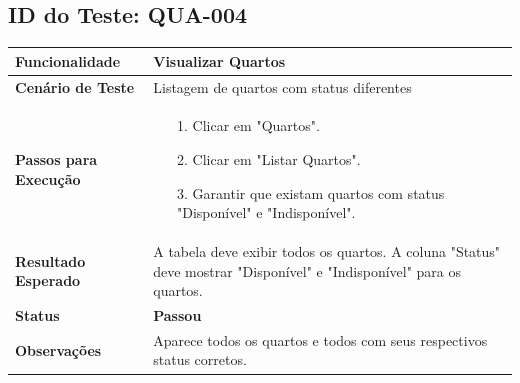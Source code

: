 \documentclass[
	12pt,				%
	openany,			%
	oneside,			%
	a4paper,			%
	english,			%
	french,				%
	spanish,			%
	brazil				%
	]{abntex2}
\begin{document}
\begin{apendicesenv}
\begin{tabular}{@{} p{5cm} p{11cm} @{}}
\end{tabular}
\vspace{1cm}

\subsection*{ID do Teste: QUA-004}
\begin{tabular}{@{} p{5cm} p{11cm} @{}}
	\toprule
	\textbf{Funcionalidade} & Visualizar Quartos \\
	\midrule
	\textbf{Cenário de Teste} & Listagem de quartos com status diferentes \\
	\midrule
	\textbf{Passos para Execução} &
	\begin{itemize} \itemsep0em 
		\item[1.] Clicar em "Quartos".
		\item[2.] Clicar em "Listar Quartos".
		\item[3.] Garantir que existam quartos com status "Disponível"  e "Indisponível".
	\end{itemize} \\
	\midrule
	\textbf{Resultado Esperado} & A tabela deve exibir todos os quartos. A coluna "Status"  deve mostrar "Disponível"  e "Indisponível"  para os quartos. \\
	\midrule
	\textbf{Status} & \textbf{Passou} \\
	\midrule
	\textbf{Observações} & Aparece todos os quartos e todos com seus respectivos status corretos.
\end{tabular}
\vspace{1cm}


\end{apendicesenv}
\end{document}
